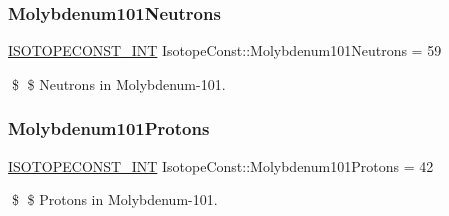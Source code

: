 \subsubsection{\texorpdfstring{Molybdenum101\+Neutrons}{Molybdenum101Neutrons}}
{\footnotesize\ttfamily \mbox{\hyperlink{group___isotope_const-_macros_ga5f18360b3e99483a35c32d789e62621c}{I\+S\+O\+T\+O\+P\+E\+C\+O\+N\+S\+T\+\_\+\+I\+NT}} Isotope\+Const\+::\+Molybdenum101\+Neutrons = 59}

\$ \$ Neutrons in Molybdenum-\/101. \mbox{\label{group___isotope_const-_molybdenum-_mo101_ga37279a11b4efad6fb01d7d1d4c9f90ba}} 
\subsubsection{\texorpdfstring{Molybdenum101\+Protons}{Molybdenum101Protons}}
{\footnotesize\ttfamily \mbox{\hyperlink{group___isotope_const-_macros_ga5f18360b3e99483a35c32d789e62621c}{I\+S\+O\+T\+O\+P\+E\+C\+O\+N\+S\+T\+\_\+\+I\+NT}} Isotope\+Const\+::\+Molybdenum101\+Protons = 42}

\$ \$ Protons in Molybdenum-\/101. 